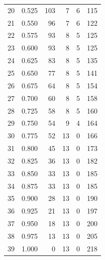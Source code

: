 \documentclass[a4paper,twoside,12pt]{book}
\begin{document}
\begin{appendices}
\begin{table}
\begin{tabular}{lrrrrr}
		20 &  0.525 &       103 &         7 &               6 &             115 \\
		21 &  0.550 &        96 &         7 &               6 &             122 \\
		22 &  0.575 &        93 &         8 &               5 &             125 \\
		23 &  0.600 &        93 &         8 &               5 &             125 \\
		24 &  0.625 &        83 &         8 &               5 &             135 \\
		25 &  0.650 &        77 &         8 &               5 &             141 \\
		26 &  0.675 &        64 &         8 &               5 &             154 \\
		27 &  0.700 &        60 &         8 &               5 &             158 \\
		28 &  0.725 &        58 &         8 &               5 &             160 \\
		29 &  0.750 &        54 &         9 &               4 &             164 \\
		30 &  0.775 &        52 &        13 &               0 &             166 \\
		31 &  0.800 &        45 &        13 &               0 &             173 \\
		32 &  0.825 &        36 &        13 &               0 &             182 \\
		33 &  0.850 &        33 &        13 &               0 &             185 \\
		34 &  0.875 &        33 &        13 &               0 &             185 \\
		35 &  0.900 &        28 &        13 &               0 &             190 \\
		36 &  0.925 &        21 &        13 &               0 &             197 \\
		37 &  0.950 &        18 &        13 &               0 &             200 \\
		38 &  0.975 &        13 &        13 &               0 &             205 \\
		39 &  1.000 &         0 &        13 &               0 &             218 \\
		\bottomrule
	\end{tabular}		
\end{table}



\end{appendices}
\end{document}
